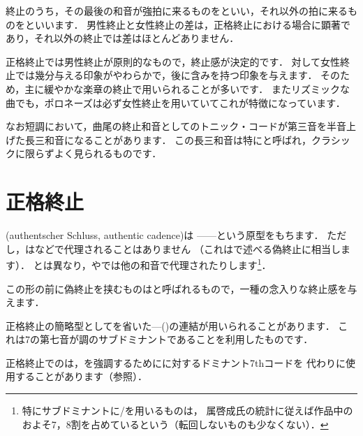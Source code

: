 \documentclass[dvipdfmx,uplatex,b5paper,openany,jbase=12Q,nomag*,textwidth-limit=44%
               ]{gachimuchi}[2020/05/05]
\begin{document}
終止のうち，その最後の和音が強拍に来るものをといい，それ以外の拍に来るものをといいます．
男性終止と女性終止の差は，正格終止における場合に顕著であり，それ以外の終止では差はほとんどありません．

正格終止では男性終止が原則的なもので，終止感が決定的です．
対して女性終止では幾分与える印象がやわらかで，後に含みを持つ印象を与えます．
そのため，主に緩やかな楽章の終止で用いられることが多いです．
またリズミックな曲でも，ポロネーズは必ず女性終止を用いていてこれが特徴になっています．

なお短調において，曲尾の終止和音としてのトニック・コードが第三音を半音上げた長三和音になることがあります．
この長三和音は特にと呼ばれ，クラシックに限らずよく見られるものです．

\section{正格終止}
\xkanjispace(authentscher Schluss, authentic cadence)は
------という原型をもちます．
ただし，は\Gnvi\Min などで代理されることはありません
（これはで述べる偽終止に相当します）．
とは異なり，やでは他の和音で代理されたりします\footnote{%
  特にサブドミナントに\Gnii\Min{}/\Gniv を用いるものは，
  属啓成氏の統計に従えば作品中のおよそ7，8割を占めているという（転回しないものも少なくない）\cite{ccSAKKA1}．
}．

この形の前に偽終止を挟むものはと呼ばれるもので，一種の念入りな終止感を与えます．

正格終止の簡略型としてを省いた\Gnv{}---\Gni(\Min)の連結が用いられることがあります．
これは\Gnv\subsc7の第七音が調のサブドミナントであることを利用したものです．

正格終止でのは，を強調するためにに対するドミナント7thコードを
代わりに使用することがあります（参照）．
\end{document}
